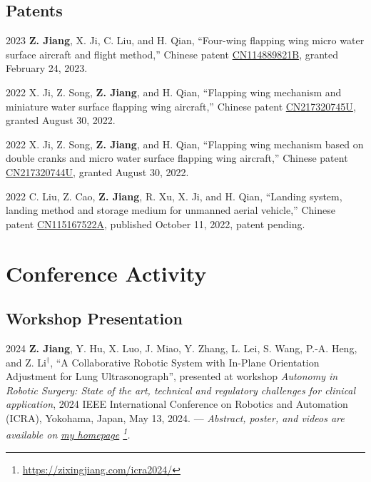 \documentclass[11pt,letterpaper]{report}
\begin{document}
\subsection*{Patents}
\begin{tablist}		
	\item[2023]   \tab{}\textbf{Z. Jiang}, X. Ji, C. Liu, and H. Qian, ``Four-wing flapping wing micro water surface aircraft and flight method,'' Chinese patent \href{https://patents.google.com/patent/CN114889821B/en?oq=CN114889821B}{CN114889821B}, granted February 24, 2023.
		
	\item[2022]   \tab{}X. Ji, Z. Song, \textbf{Z. Jiang}, and H. Qian, ``Flapping wing mechanism and miniature water surface flapping wing aircraft,'' Chinese patent \href{https://patents.google.com/patent/CN217320745U/en?oq=CN217320745U}{CN217320745U}, granted August 30, 2022.  
		
	\item[2022]   \tab{}X. Ji, Z. Song, \textbf{Z. Jiang}, and H. Qian, ``Flapping wing mechanism based on double cranks and micro water surface flapping wing aircraft,'' Chinese patent \href{https://patents.google.com/patent/CN217320744U/en?oq=CN217320744U}{CN217320744U}, granted August 30, 2022.  
		
	\item[2022]   \tab{}C. Liu, Z. Cao, \textbf{Z. Jiang}, R. Xu, X. Ji, and H. Qian, ``Landing system, landing method and storage medium for unmanned aerial vehicle,'' Chinese patent \href{https://patents.google.com/patent/CN115167522A/en?oq=CN115167522A}{CN115167522A}, published October 11, 2022, patent pending.
\end{tablist}
	
	
	
\section*{Conference Activity}
\subsection*{Workshop Presentation}
\begin{tablist}
	\item[2024] \tab \textbf{Z. Jiang}, Y. Hu, X. Luo, J. Miao, Y. Zhang, L. Lei, S. Wang, P.-A. Heng, and Z. Li$^\dagger$, ``A Collaborative Robotic System with In-Plane Orientation Adjustment for Lung Ultrasonograph'', presented at workshop \textit{Autonomy in Robotic Surgery: State of the art, technical and regulatory challenges for clinical application}, 2024 IEEE International Conference on Robotics and Automation (ICRA), Yokohama, Japan, May 13, 2024. --- \emph{Abstract, poster, and videos are available on \href{https://zixingjiang.com/icra2024/}{my homepage} \footnote{\href{https://zixingjiang.com/icra2024/}{https://zixingjiang.com/icra2024/}}.}
\end{tablist}
	
\end{document}
